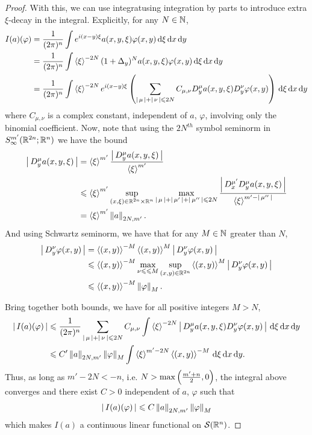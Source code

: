 \documentclass[12pt]{article}
\begin{document}
\begin{proof}
    With this, we can use integratusing integration by parts to introduce extra $\xi$-decay in the integral. Explicitly, for any $N \in \N$, 
    \begin{align*}
        I(a)(\varphi) 
        & = \frac{1}{(2\pi)^n} \int e^{i(x- y)\xi} a(x, y, \xi) \varphi(x, y) \d[\xi] \d[x] \d[y]\\
        & = \frac{1}{(2\pi)^n} \int \sym[\xi]^{-2N} (1 + \Delta_y)^N a(x, y, \xi) \varphi(x, y) \d[\xi] \d[x] \d[y]\\
        &=  \frac{1}{(2\pi)^n} \int \sym[\xi]^{-2N} e^{i (x - y) \xi } \brac{ \sum_{\abs{\mu} + \abs{\nu} \leq 2N} C_{\mu, \nu}  D^\mu_y a(x, y, \xi) D^\nu_{y} \varphi(x, y)} \d[\xi] \d[x] \d[y]\\
    \end{align*}
    where $C_{\mu, \nu}$ is a complex constant, independent of $a$, $\varphi$, involving only the binomial coefficient. Now, note that using the $2N^{th}$ symbol seminorm in $S^{m'}_{\infty}(\R^{2n}; \R^{n})$ we have the bound
    \begin{align*}
    \abs{D^\mu_y a(x, y, \xi)} 
    &= \sym[\xi]^{m' } \frac{\abs{D^\mu_y a(x, y, \xi)}}{\sym[\xi]^{m'}} \\
    & \leq \sym[\xi]^{m'} \sup_{(x, \xi) \in \R^{2n} \times \R^n} \max_{\abs{\mu} + \abs{\mu'} + \abs{\mu''} \leq 2N} \frac{\abs{D^{\mu'}_x D^\mu_y a(x, y, \xi)}}{\sym[\xi]^{m' - \abs{\mu''}}} \\
    & = \sym[\xi]^{m'} \norm[a]_{2N,m'}. 
    \end{align*}
    And using Schwartz seminorm, we have that for any $M \in \N$ greater than $N$,  
    \begin{align*}
    \abs{D^\nu_y \varphi(x, y)} 
    &= \sym[(x, y)]^{- M} \sym[(x, y)]^{M} \abs{D^{\nu}_{y} \varphi(x,y)} \\
    & \leq  \sym[(x, y)]^{- M} \max_{\nu{\leq} \leq M} \sup_{(x, y) \in \R^{2n}} \sym[(x, y)]^{M} \abs{D^{\nu}_{y} \varphi(x,y)}\\
    & \leq \sym[(x, y)]^{-M} \norm[\varphi]_{M}. 
    \end{align*}

    Bring together both bounds, we have for all positive integers $M > N$, 
    \begin{align*}
        \abs{I(a)(\varphi)} 
        & \leq  \frac{1}{(2\pi)^n} \sum_{\abs{\mu} + \abs{\nu} \leq 2N} C_{\mu, \nu}  \int \sym[\xi]^{-2N} \abs{ D^\mu_y a(x, y, \xi) D^\nu_{y} \varphi(x, y)} \d[\xi] \d[x] \d[y]\\
        & \leq  C' \norm[a]_{2N,m'} \norm[\varphi]_{M}  \int \sym[\xi]^{m ' -2N} \sym[(x, y)]^{-M}  \d[\xi] \d[x] \d[y]. \\
    \end{align*}
    Thus, as long as $m' - 2N < -n$, i.e. $N > \max\brac{\frac{m' + n}{2}, 0}$, the integral above converges and there exist $C > 0$ independent of $a$, $\varphi$ such that   
    \begin{align*}
        \abs{I(a)(\varphi)} \leq C \norm[a]_{2N, m'}\norm[\varphi]_{M} 
    \end{align*}
    which makes $I(a)$ a continuous linear functional on $\sch(\R^n)$. 
    
\end{proof}
\end{document}

